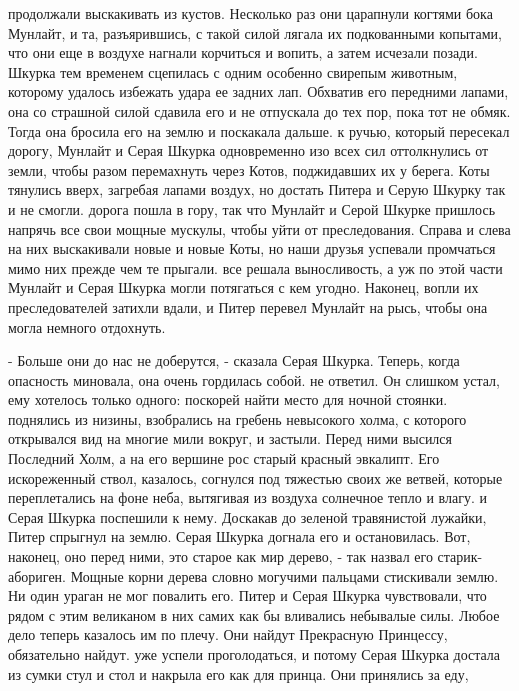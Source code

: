 продолжали выскакивать из кустов. Несколько раз они царапнули когтями 
бока Мунлайт, и та, разъярившись, с такой силой лягала их подкованными 
копытами, что они еще в воздухе нагнали корчиться и вопить, а затем 
исчезали позади.
 Шкурка тем временем сцепилась с одним особенно свирепым 
животным, которому удалось избежать удара ее задних лап. Обхватив его 
передними лапами, она со страшной силой сдавила его и не отпускала до 
тех пор, пока тот не обмяк. Тогда она бросила его на землю и поскакала 
дальше.
 к ручью, который пересекал дорогу, Мунлайт и Серая Шкурка 
одновременно изо всех сил оттолкнулись от земли, чтобы разом 
перемахнуть через Котов, поджидавших их у берега. Коты тянулись вверх, 
загребая лапами воздух, но достать Питера и Серую Шкурку так и не 
смогли.
 дорога пошла в гору, так что Мунлайт и Серой Шкурке 
пришлось напрячь все свои мощные мускулы, чтобы уйти от преследования. 
Справа и слева на них выскакивали новые и новые Коты, но наши друзья 
успевали промчаться мимо них прежде чем те прыгали.
 все решала выносливость, а уж по этой части Мунлайт и Серая 
Шкурка могли потягаться с кем угодно. Наконец, вопли их 
преследователей затихли вдали, и Питер перевел Мунлайт на рысь, чтобы 
она могла немного отдохнуть.
\par- Больше они до нас не доберутся, - сказала Серая Шкурка. Теперь, 
когда опасность миновала, она очень гордилась собой.
 не ответил. Он слишком устал, ему хотелось только одного: 
поскорей найти место для ночной стоянки.
 поднялись из низины, взобрались на гребень невысокого холма, с 
которого открывался вид на многие мили вокруг, и застыли. Перед ними 
высился Последний Холм, а на его вершине рос старый красный эвкалипт. 
Его искореженный ствол, казалось, согнулся под тяжестью своих же 
ветвей, которые переплетались на фоне неба, вытягивая из воздуха 
солнечное тепло и влагу.
 и Серая Шкурка поспешили к нему. Доскакав до зеленой 
травянистой лужайки, Питер спрыгнул на землю. Серая Шкурка догнала его 
и остановилась. Вот, наконец, оно перед ними, это старое как мир 
дерево, - так назвал его старик-абориген. Мощные корни дерева словно 
могучими пальцами стискивали землю. Ни один ураган не мог повалить 
его. Питер и Серая Шкурка чувствовали, что рядом с этим великаном в 
них самих как бы вливались небывалые силы. Любое дело теперь казалось 
им по плечу. Они найдут Прекрасную Принцессу, обязательно найдут.
 уже успели проголодаться, и потому Серая Шкурка достала из 
сумки стул и стол и накрыла его как для принца. Они принялись за еду, 
